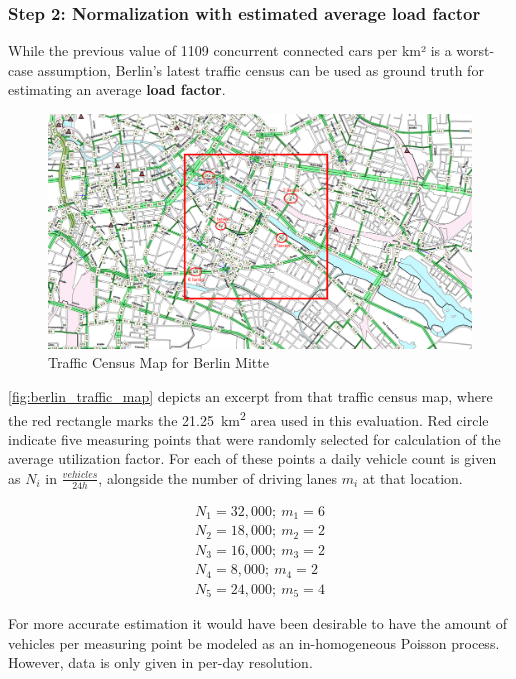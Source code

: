 \subsubsection{Step 2: Normalization with estimated average load factor}
While the previous value of 1109 concurrent connected cars per km² is a worst-case assumption, Berlin's latest traffic census \cite{VerkehrslenkungBerlinVLB2014} can be used as ground truth for estimating an average \textbf{load factor}. 

\begin{figure}[H]
	\centering
	\includegraphics[width=1.0\linewidth]{98_images/berlin_traffic_map_2}
	\caption[Traffic Census Map for Berlin Mitte]{Traffic Census Map for Berlin Mitte \cite{VerkehrslenkungBerlinVLB2014}}
	\label{fig:berlin_traffic_map}
\end{figure}

\autoref{fig:berlin_traffic_map} depicts an excerpt from that traffic census map, where the red rectangle marks the \SI{21.25}{\square\km} area used in this evaluation. Red circle indicate five measuring points that were randomly selected for calculation of the average utilization factor. For each of these points a daily vehicle count is given as $N_{i}$ in $\frac{vehicles}{24 h}$, alongside the number of driving lanes $m_i$ at that location.

\begin{gather*}
N_1 = 32,000; \  m_1 = 6 \\
N_2 = 18,000; \  m_2 = 2 \\
N_3 = 16,000; \  m_3 = 2 \\
N_4 = 8,000; \  m_4 = 2 \\
N_5 = 24,000; \  m_5 = 4
\end{gather*}

For more accurate estimation it would have been desirable to have the amount of vehicles per measuring point be modeled as an in-homogeneous Poisson process. However, data is only given in per-day resolution. 

